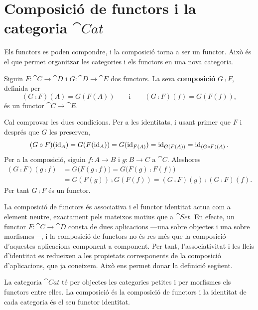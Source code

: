 \section{Composició de functors i la categoria \texorpdfstring{$\cat{Cat}$}{Cat}}

Els functors es poden compondre, i la composició torna a ser un functor. Això és el que permet organitzar les categories i els functors en una nova categoria.

\begin{proposicio}
Siguin $F\colon\cat{C}\to\cat{D}$ i $G\colon\cat{D}\to\cat{E}$ dos functors. La seva \textbf{composició} $G\comp F$, definida per
\[
(G\comp F)(A)=G(F(A))
\qquad\text{i}\qquad
(G\comp F)(f)=G(F(f)),
\]
és un functor $\cat{C}\to\cat{E}$.
\end{proposicio}

\begin{prova}
Cal comprovar les dues condicions. Per a les identitats, i usant primer que $F$ i després que $G$ les preserven,
\[
(G\circ F)(\operatorname{id}_A)=G(F(\operatorname{id}_A))=G(\operatorname{id}_{F(A)})=\operatorname{id}_{G(F(A))}=\operatorname{id}_{(G\circ F)(A)}.
\]
Per a la composició, siguin $f\colon A\to B$ i $g\colon B\to C$ a $\cat{C}$. Aleshores
\[
\begin{aligned}
(G\comp F)(g\comp f)
&=G\big(F(g\comp f)\big)
=G\big(F(g)\comp F(f)\big)\\
&=G(F(g))\comp G(F(f))
=(G\comp F)(g)\comp(G\comp F)(f).
\end{aligned}
\]
Per tant $G\comp F$ és un functor.
\end{prova}

La composició de functors és associativa i el functor identitat actua com a element neutre, exactament pels mateixos motius que a $\cat{Set}$. En efecte, un functor $F\colon\cat{C}\to\cat{D}$ consta de dues aplicacions ---una sobre objectes i una sobre morfismes---, i la composició de functors no és res més que la composició d'aquestes aplicacions component a component. Per tant, l'associativitat i les lleis d'identitat es redueixen a les propietats corresponents de la composició d'aplicacions, que ja coneixem. Això ens permet donar la definició següent.

\begin{definicio}
La categoria $\cat{Cat}$ té per objectes les categories petites i per morfismes els functors entre elles. La composició és la composició de functors i la identitat de cada categoria és el seu functor identitat.
\end{definicio}

